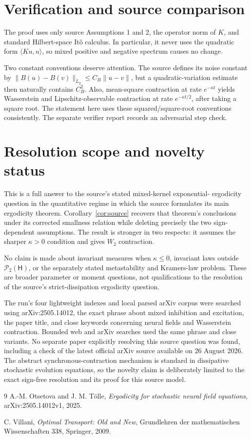 \documentclass[11pt]{article}
\newcommand{\HH}{\mathsf H}
\newcommand{\PP}{\mathcal P_2}
\begin{document}
\section{Verification and source comparison}

The proof uses only source Assumptions 1 and 2, the operator norm of \(K\),
and standard Hilbert-space It\^o calculus.  In particular, it never uses the
quadratic form \(\langle Ku,u\rangle\), so mixed positive and negative
spectrum causes no change.

Two constant conventions deserve attention.  The source defines its noise
constant by \(\lVert B(u)-B(v)\rVert_{L_2}\le C_B\lVert u-v\rVert\), but a
quadratic-variation estimate then naturally contains \(C_B^2\).  Also,
mean-square contraction at rate \(e^{-\kappa t}\) yields Wasserstein and
Lipschitz-observable contraction at rate \(e^{-\kappa t/2}\), after taking a
square root.  The statement here uses these squared/square-root conventions
consistently.  The separate verifier report records an adversarial step check.

\section{Resolution scope and novelty status}

This is a full answer to the source's stated mixed-kernel exponential-
ergodicity question in the quantitative regime in which the source formulates
its main ergodicity theorem.  Corollary~\ref{cor:source} recovers that theorem's
conclusions under its corrected smallness relation while deleting precisely
the two sign-dependent assumptions.  The result is stronger in two respects:
it assumes the sharper \(\kappa>0\) condition and gives \(W_2\) contraction.

No claim is made about invariant measures when \(\kappa\le0\), invariant laws
outside \(\PP(\HH)\), or the separately stated metastability and Kramers-law
problem.  These are broader parameter or moment questions, not qualifications
to the resolution of the source's strict-dissipation ergodicity question.

The run's four lightweight indexes and local parsed arXiv corpus were searched
using arXiv:2505.14012, the exact phrase about mixed inhibition and excitation,
the paper title, and close keywords concerning neural fields and Wasserstein
contraction.  Bounded web and arXiv searches used the same phrase and close
variants.  No separate paper explicitly resolving this source question was
found, including a check of the latest official arXiv source available on
26 August 2026.  The abstract synchronous-contraction mechanism is standard
in dissipative stochastic evolution equations, so the novelty claim is
deliberately limited to the exact sign-free resolution and its proof for this
source model.

\raggedright
\begin{thebibliography}{9}
A.-M. Otsetova and J. M. T\"olle,
\emph{Ergodicity for stochastic neural field equations},
arXiv:2505.14012v1, 2025.

C. Villani,
\emph{Optimal Transport: Old and New},
Grundlehren der mathematischen Wissenschaften 338, Springer, 2009.
\end{thebibliography}
\end{document}
